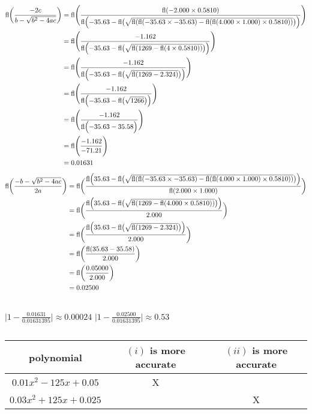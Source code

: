 \documentclass[11pt]{article}
\DeclareMathOperator{\fl}{fl}
\begin{document}
\subsection{} %
\begin{align*}
	\fl\biggl(\frac{-2c}{b-\sqrt{b^2-4ac}}\biggr)&=\fl\Biggl(\frac{\fl(-2.000\times0.5810)}{\fl\Bigl(-35.63-\fl\bigl(\sqrt{\fl(\fl(-35.63\times-35.63)-\fl(\fl(4.000\times1.000)\times0.5810))}\bigr)\Bigr)}\Biggr)\\
	&=\fl\Biggl(\frac{-1.162}{\fl\Bigl(-35.63-\fl\bigl(\sqrt{\fl(1269-\fl(4\times0.5810))}\bigr)\Bigr)}\Biggr)\\
	&=\fl\Biggl(\frac{-1.162}{\fl\Bigl(-35.63-\fl\bigl(\sqrt{\fl(1269-2.324)}\bigr)\Bigr)}\Biggr)\\
	&=\fl\Biggl(\frac{-1.162}{\fl\Bigl(-35.63-\fl\bigl(\sqrt{1266}\bigr)\Bigr)}\Biggr)\\
	&=\fl\Biggl(\frac{-1.162}{\fl\Bigl(-35.63-35.58\Bigr)}\Biggr)\\
	&=\fl\Biggl(\frac{-1.162}{-71.21}\Biggr)\\
	&=0.01631
\end{align*}
\begin{align*}
	\fl\biggl(\frac{-b-\sqrt{b^2-4ac}}{2a}\biggr)&=\fl\biggl(\frac{\fl\Bigl(35.63-\fl\bigl(\sqrt{\fl(\fl(-35.63\times-35.63)-\fl(\fl(4.000\times1.000)\times0.5810))}\bigr)\Bigr)}{\fl(2.000\times1.000)}\biggr)\\
	&=\fl\biggl(\frac{\fl\Bigl(35.63-\fl\bigl(\sqrt{\fl(1269-\fl(4.000\times0.5810))}\bigr)\Bigr)}{2.000}\biggr)\\
	&=\fl\biggl(\frac{\fl\Bigl(35.63-\fl\bigl(\sqrt{\fl(1269-2.324)}\bigr)\Bigr)}{2.000}\biggr)\\
	&=\fl\biggl(\frac{\fl(35.63-35.58)}{2.000}\biggr)\\
	&=\fl\biggl(\frac{0.05000}{2.000}\biggr)\\
	&=0.02500
\end{align*}


\subsection{} %
$\big\vert1-\frac{0.01631}{0.01631395}\big\vert\approx0.00024$
\newline
\newline
$\big\vert1-\frac{0.02500}{0.01631395}\big\vert\approx0.53$


\subsection{} %
\begin{tabular}{|c|c|c|}
	\hline
	polynomial & $(i)$ is more accurate & $(ii)$ is more accurate\\
	\hline
	$0.01x^2-125x+0.05$ & X &\\
	\hline
	$0.03x^2+125x+0.025$ && X\\
	\hline
\end{tabular}
\end{document}
